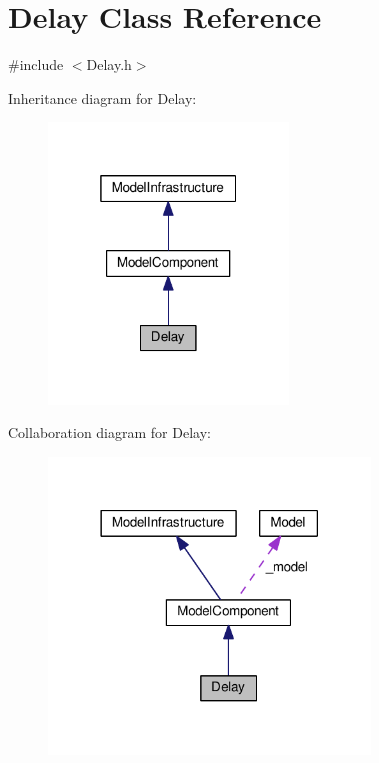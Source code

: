 \hypertarget{class_delay}{}\section{Delay Class Reference}
\label{class_delay}


{\ttfamily \#include $<$Delay.\+h$>$}



Inheritance diagram for Delay\+:
\nopagebreak
\begin{figure}[H]
\begin{center}
\leavevmode
\includegraphics[width=181pt]{class_delay__inherit__graph}
\end{center}
\end{figure}


Collaboration diagram for Delay\+:
\nopagebreak
\begin{figure}[H]
\begin{center}
\leavevmode
\includegraphics[width=242pt]{class_delay__coll__graph}
\end{center}
\end{figure}
